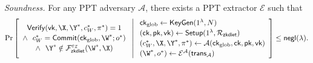 \documentclass[runningheads]{llncs}
\begin{document}
\noindent\emph{Soundness.} For any PPT adversary $\mathcal{A}$, there exists a PPT extractor $\mathcal{E}$ such that
\[
  \Pr \left[
  \begin{array}{c}
    \mathsf{Verify}(\mathsf{vk}, \X, \Y^{*}, c_{W}^{*}, \pi^{*}) = 1 \\[2pt]
    \land\ \ c_{W}^{*} = \mathsf{Commit}(\mathsf{ck}_{\mathrm{glob}}, \W^{*}; o^{*}) \\[2pt]
    \land\ \ \Y^{*} \notin \mathcal{F}^{\varepsilon_\mathcal{I}}_{\mathsf{zkdiet}}(\W^{*}, \X)
  \end{array}
  \;\middle|\;
  \begin{array}{l}
    \mathsf{ck}_{\mathrm{glob}} \leftarrow \mathsf{KeyGen}(1^{\lambda}, N) \\[2pt]
    (\mathsf{ck}, \mathsf{pk}, \mathsf{vk}) \leftarrow \mathsf{Setup}(1^{\lambda}, \mathcal{R}_{\mathsf{zkdiet}}) \\[2pt]
    (c_{W}^{*}, \X, \Y^{*}, \pi^{*}) \leftarrow \mathcal{A}(\mathsf{ck}_{\mathrm{glob}}, \mathsf{ck}, \mathsf{pk}, \mathsf{vk}) \\[2pt]
    (\W^{*}, o^{*}) \leftarrow \mathcal{E}^{\mathcal{A}}(\mathsf{trans}_{\mathcal{A}})
  \end{array}
  \right] \le \mathsf{negl}(\lambda).
\]
\end{document}
